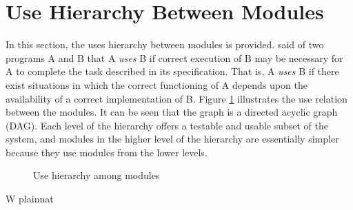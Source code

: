\documentclass[12pt, titlepage]{article}
\begin{document}
\section{Use Hierarchy Between Modules} \label{SecUse}

In this section, the uses hierarchy between modules is
provided. \citet{Parnas1978} said of two programs A and B that A {\em uses} B if
correct execution of B may be necessary for A to complete the task described in
its specification. That is, A {\em uses} B if there exist situations in which
the correct functioning of A depends upon the availability of a correct
implementation of B.  Figure \ref{FigUH} illustrates the use relation between
the modules. It can be seen that the graph is a directed acyclic graph
(DAG). Each level of the hierarchy offers a testable and usable subset of the
system, and modules in the higher level of the hierarchy are essentially simpler
because they use modules from the lower levels.

\begin{figure}[H]
\centering
\caption{Use hierarchy among modules}
\label{FigUH}
\end{figure}

W
 {plainnat}


\newpage{}
\end{document}
